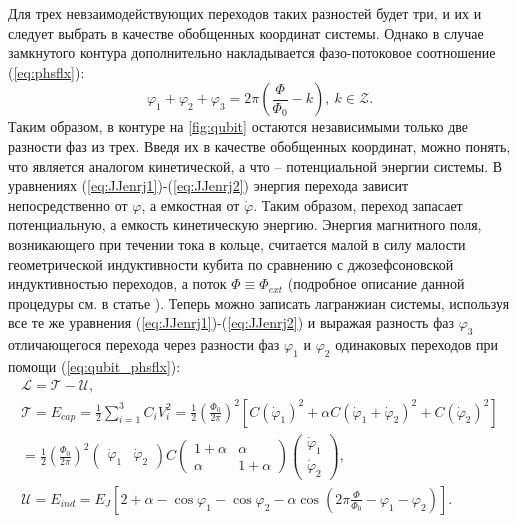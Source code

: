 \documentclass[12pt, twoside]{report}
\numberwithin{equation}{section}
\numberwithin{figure}{section}
\begin{document}
 
Для трех невзаимодействующих переходов таких разностей будет три, и их и следует выбрать в качестве обобщенных координат системы. Однако в случае замкнутого контура дополнительно накладывается фазо-потоковое соотношение (\ref{eq:phsflx}):
\begin{equation}
\varphi_1 + \varphi_2 + \varphi_3 = 2\pi\left(\frac{\Phi}{\Phi_0} - k\right),\ k\in \mathcal{Z}.
\label{eq:qubit_phsflx}
\end{equation}
Таким образом, в контуре на \autoref{fig:qubit} остаются независимыми только две разности фаз из трех. Введя их в качестве обобщенных координат, можно понять, что является аналогом кинетической, а что -- потенциальной энергии системы. В уравнениях (\ref{eq:JJenrj1})-(\ref{eq:JJenrj2}) энергия перехода зависит непосредственно от $\varphi$, а емкостная от $\dot \varphi$. Таким образом, переход запасает потенциальную, а емкость кинетическую энергию. Энергия магнитного поля, возникающего при течении тока в кольце, считается малой в силу малости геометрической индуктивности кубита по сравнению с джозефсоновской индуктивностью переходов, а поток $\Phi \equiv \Phi_{ext}$ (подробное описание данной процедуры см. в статье \cite{Robertson2006}). Теперь можно записать лагранжиан системы, используя все те же уравнения (\ref{eq:JJenrj1})-(\ref{eq:JJenrj2}) и выражая разность фаз $\varphi_3$ отличающегося перехода через разности фаз $\varphi_1$ и $\varphi_2$ одинаковых переходов при помощи (\ref{eq:qubit_phsflx}):
\begin{gather*}
\mathcal{L} = \mathcal{T}-\mathcal{U}, \\
\mathcal{T} = E_{cap} =\frac{1}{2}\sum_{i=1}^3 C_i V_i^2 = \frac{1}{2} \left(\frac{\Phi_0}{2\pi}\right)^2 \left[C(\dot \varphi_1)^2 + \alpha C \left(\dot \varphi_1 + \dot\varphi_2\right)^2 + C(\dot \varphi_2)^2\right] \\
= \frac{1}{2}\left(\frac{\Phi_0}{2\pi}\right)^2 \left(\begin{matrix}
\dot\varphi_1 &\dot\varphi_2
\end{matrix}\right) C \left(\begin{matrix}
1+\alpha & \alpha \\
\alpha & 1+\alpha
\end{matrix}
\right)
\left(\begin{matrix}
\dot\varphi_1 \\
\dot\varphi_2
\end{matrix}\right),\\
\mathcal{U} = E_{ind} = E_J\left[2+\alpha - \cos\varphi_1 - \cos\varphi_2 - \alpha \cos\left(2\pi\frac{\Phi}{\Phi_0} - \varphi_1 - \varphi_2 \right)\right].
\end{gather*}
\end{document}
